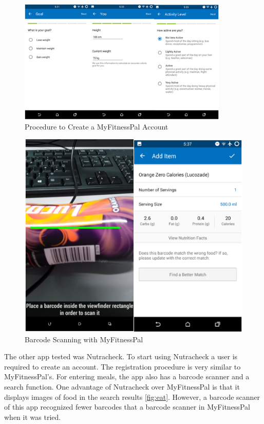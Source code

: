 \begin{figure}[ht]
\centering
\includegraphics[width=10cm]{Figures/2/mfp2.png}
\caption{Procedure to Create a MyFitnessPal Account}
\label{fig:mfp2}
\end{figure}

\begin{figure}[ht]
\centering
\includegraphics{Figures/2/mfp3.PNG}
\caption{Barcode Scanning with MyFitnessPal}
\label{fig:mfp2}
\end{figure}

The other app tested was Nutracheck. To start using Nutracheck a user is required to create an account. The registration procedure is very similar to MyFitnessPal's. For entering meals, the app also has a barcode scanner and a search function. One  advantage of Nutracheck  over MyFitnessPal is that it displays images of food in the search results \autoref{fig:eat}. However,  a  barcode scanner of this app recognized fewer barcodes that a barcode scanner in MyFitnessPal when it was tried.


